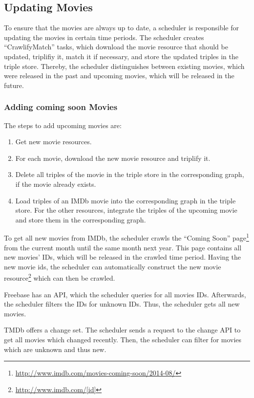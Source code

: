 \subsection{Updating Movies}
\label{subsec_method_updating}

To ensure that the movies are always up to date, a scheduler is responsible for updating the movies in certain time periods.
The scheduler creates ``CrawlifyMatch'' tasks, which download the movie resource that should be updated, triplifiy it, match it if necessary, and store the updated triples in the triple store.
Thereby, the scheduler distinguishes between existing movies, which were released in the past and upcoming movies, which will be released in the future.

\subsubsection{Adding coming soon Movies}
The steps to add upcoming movies are:
\begin {enumerate}
	\item Get new movie resources.
	\item For each movie, download the new movie resource and triplify it.
	\item Delete all triples of the movie in the triple store in the corresponding graph, if the movie already exists.
	\item Load triples of an IMDb movie into the corresponding graph in the triple store. For the other resources, integrate the triples of the upcoming movie and store them in the corresponding graph.
\end{enumerate}

To get all new movies from IMDb, the scheduler crawls the ``Coming Soon'' page\footnote{\url{http://www.imdb.com/movies-coming-soon/2014-08/}} from the current month until the same month next year.
This page contains all new movies' IDs, which will be released in the crawled time period.
Having the new movie ids, the scheduler can automatically construct the new movie resource\footnote{\url{http://www.imdb.com/[id]}} which can then be crawled.

Freebase has an API, which the scheduler queries for all movies IDs.
Afterwards, the scheduler filters the IDs for unknown IDs.
Thus, the scheduler gets all new movies.

TMDb offers a change set.
The scheduler sends a request to the change API to get all movies which changed recently.
Then, the scheduler can filter for movies which are unknown and thus new.

